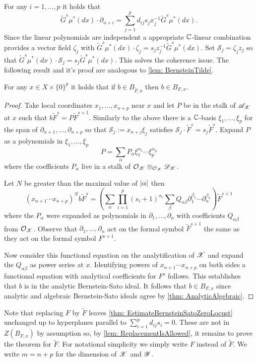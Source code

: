 For any $i=1,\ldots,p$ it holds that
$$\widetilde{G}^s \mu^*(dx)\cdot \partial_{n+i} = \sum_{j=1}^p d_{ij}s_j x_j^{-1} \widetilde{G}^s \mu^*(dx).$$
Since the linear polynomials are independent a appropriate $\mathbb{C}$-linear combination provides a vector field $\zeta_j$ with $\widetilde{G}^s \mu^*(dx)\cdot \zeta_j = s_{j}z_j^{-1}\widetilde{G}^s \mu^*(dx)$.
Set $\mathcal{S}_j = \zeta_jz_j$ so that $\widetilde{G}^s \mu^*(dx) \cdot \mathcal{S}_j = s_j \widetilde{G}^s \mu^*(dx) $.
This solves the coherence issue.
The following result and it's proof are analogous to \cref{lem: BernsteinTilde}.
\begin{lemma}\label{lem: ReplacementIsAllowed}
  For any $x\in X\times \{0\}^p$ it holds that if $b\in B_{\widetilde{F},x}$ then $b \in B_{F,x}$.
\end{lemma}
\begin{proof}
  Take local coordinates $x_1,\ldots, x_{n+p}$ near $x$ and let $P$ be in the stalk of $\mathscr{A}_{\mathscr{X}}$ at $x$ such that $b \widetilde{F}^s = P \widetilde{F}^{s+1}$.
  Similarly to the above there is a $\mathbb{C}$-basis $\xi_1,\ldots,\xi_p$ for the span of $\partial_{n+1}, \ldots, \partial_{n+p}$ so that $\mathcal{S}_j := x_{n+j}\xi_j$ satisfies $\mathcal{S}_j \cdot \widetilde{F}^s = s_{j}\widetilde{F}^s$.
  Expand $P$ as a polynomials in $\xi_1,\ldots,\xi_p$
  $$P = \sum_{\alpha} P_\alpha \xi_{1}^{\alpha_1}\cdots \xi_{p}^{\alpha_p}$$
  where the coefficients $P_\alpha$ live in a stalk of $\mathcal{O}_{\mathscr{X}}\otimes_{\mathcal{O}_{\mathscr{X}}}\mathscr{D}_{\mathscr{X}}$.

  Let $N$ be greater than the maximal value of $\vert \alpha \vert$ then
  $$(x_{n+1}\cdots x_{n+p})^N b \widetilde{F}^s = \left(\sum_{\alpha} \prod_{i=1}^p (s_i + 1)^{\alpha_i} \sum_\beta Q_{\alpha\beta} \partial_1^{\beta_1}\cdots \partial_n^{\beta_n} \right)\widetilde{F}^{s+1}$$
  where the $P_\alpha$ were expanded as polynomials in $\partial_1,\ldots,\partial_n$ with coefficients $Q_{\alpha\beta}$ from $\mathcal{O}_{\mathscr{X}}$.
  Observe that $\partial_1,\ldots, \partial_n$ act on the formal symbol $\widetilde{F}^{s+1}$ the same as they act on the formal symbol $F^{s+1}$.

  Now consider this functional equation on the analytification of $\mathscr{X}$ and expand the $Q_{\alpha\beta}$ as power series at $x$.
  Identifying powers of $x_{n+1}\cdots x_{n+p}$ on both sides a functional equation with analytical coefficients for $F^s$ follows.
  This establishes that $b$ is in the analytic Bernstein-Sato ideal.
  It follows that $ b\in B_{F,x}$ since analytic and algebraic Bernstein-Sato ideals agree by \cref{thm: AnalyticAlgebraic}.
\end{proof}
Note that replacing $F$ by $\widetilde{F}$ leaves \cref{thm: EstimateBernsteinSatoZeroLocust} unchanged up to hyperplanes parallel to $\sum_{i=1}^p d_{ij}s_i = 0$.
These are not in $Z(B_{F,x})$ by assumption so, by \cref{lem: ReplacementIsAllowed}, it remains to prove the theorem for $\widetilde{F}$.
For notational simplicity we simply write $F$ instead of $\widetilde{F}$.
We write $m = n + p$ for the dimension of $\mathscr{X}$ and $\mathscr{Y}$.

